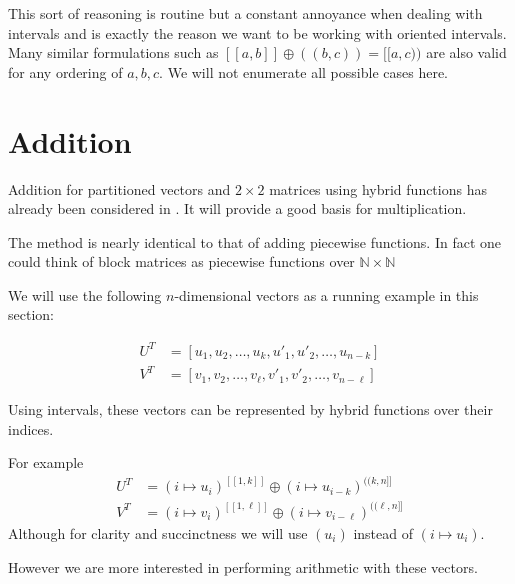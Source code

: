 This sort of reasoning is routine but a constant annoyance when dealing with intervals and is exactly the reason we want to be working with oriented intervals.
Many similar formulations such as $[\![ a,b ]\!] \oplus (\!( b,c )\!) = [\![a,c)\!)$ are also valid for any ordering of $a,b,c$.
We will not enumerate all possible cases here.





%
%

\section{Addition}
Addition for partitioned vectors and $2 \times 2$ matrices using hybrid functions has already been considered in \cite{carette2010}.
It will provide a good basis for multiplication.



The method is nearly identical to that of adding piecewise functions.
In fact one could think of block matrices as piecewise functions over $\mathbb{N} \times \mathbb{N}$


We will use the following $n$-dimensional vectors as a running example in this section:

\begin{align}
	U^T &= [ u_1, u_2, \ldots, u_{k}, u'_1, u'_2, \ldots, u_{n-k} ] \\
	V^T &= [ v_1, v_2, \ldots, v_{\ell}, v'_1, v'_2, \ldots, v_{n-\ell} ]
\end{align}

Using intervals, these vectors can be represented by hybrid functions over their indices.

For example
\begin{align}
	U^T &= (i \mapsto u_i)^{[\![1, k]\!]} \oplus (i \mapsto u_{i-k})^{(\!(k,n]\!]} \\
	V^T &= (i \mapsto v_i)^{[\![1, \ell]\!]} \oplus (i \mapsto v_{i-\ell})^{(\!(\ell,n]\!]}
\end{align}
Although for clarity and succinctness we will use $(u_i)$ instead of $(i \mapsto u_i)$.

However we are more interested in performing arithmetic with these vectors.




